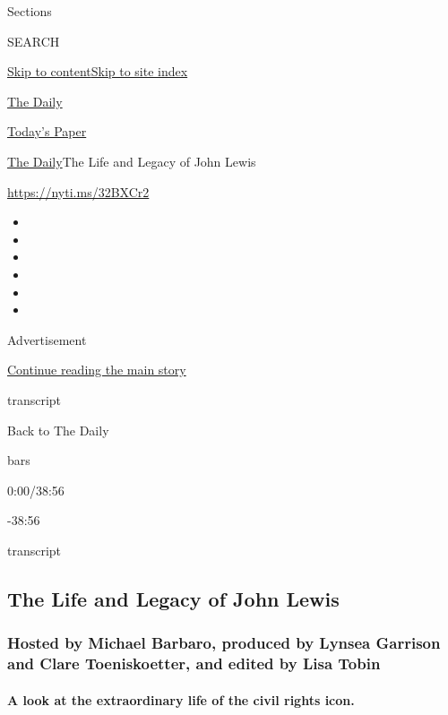 Sections

SEARCH

\protect\hyperlink{site-content}{Skip to
content}\protect\hyperlink{site-index}{Skip to site index}

\href{https://www.nytimes.com/podcasts/the-daily}{The Daily}

\href{https://myaccount.nytimes.com/auth/login?response_type=cookie\&client_id=vi}{}

\href{https://www.nytimes.com/section/todayspaper}{Today's Paper}

\href{/podcasts/the-daily}{The Daily}\textbar{}The Life and Legacy of
John Lewis

\url{https://nyti.ms/32BXCr2}

\begin{itemize}
\item
\item
\item
\item
\item
\item
\end{itemize}

Advertisement

\protect\hyperlink{after-top}{Continue reading the main story}

transcript

Back to The Daily

bars

0:00/38:56

-38:56

transcript

\hypertarget{the-life-and-legacy-of-john-lewis}{%
\subsection{The Life and Legacy of John
Lewis}\label{the-life-and-legacy-of-john-lewis}}

\hypertarget{hosted-by-michael-barbaro-produced-by-lynsea-garrison-and-clare-toeniskoetter-and-edited-by-lisa-tobin}{%
\subsubsection{Hosted by Michael Barbaro, produced by Lynsea Garrison
and Clare Toeniskoetter, and edited by Lisa
Tobin}\label{hosted-by-michael-barbaro-produced-by-lynsea-garrison-and-clare-toeniskoetter-and-edited-by-lisa-tobin}}

\hypertarget{a-look-at-the-extraordinary-life-of-the-civil-rights-icon}{%
\paragraph{A look at the extraordinary life of the civil rights
icon.}\label{a-look-at-the-extraordinary-life-of-the-civil-rights-icon}}

